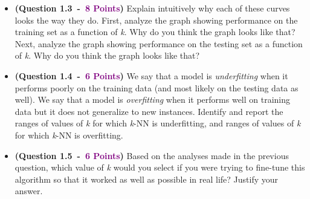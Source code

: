 \documentclass{article}
\newcommand{\POINTS}[1]{\textcolor{purple}{\textbf{{#1}}}}
\begin{document}
\begin{itemize}
        \item \textbf{(Question 1.3~-~\POINTS{8 Points})} Explain intuitively why each of these curves looks the way they do. First, analyze the graph showing performance on the training set as a function of \textit{k}. Why do you think the graph looks like that? Next, analyze the graph showing performance on the testing set as a function of \textit{k}. Why do you think the graph looks like that?




        \item \textbf{(Question 1.4~-~\POINTS{6 Points})} We say that a model is \textit{underfitting} when it performs poorly on the training data (and most likely on the testing data as well). We say that a model is \textit{overfitting} when it performs well on training data but it does not generalize to new instances. Identify and report the ranges of values of \textit{k} for which \textit{k}-NN is underfitting, and ranges of values of \textit{k} for which \textit{k}-NN is overfitting.




        \item \textbf{(Question 1.5~-~\POINTS{6 Points})} Based on the analyses made in the previous question, which value of \textit{k} would you select if you were trying to fine-tune this algorithm so that it worked as well as possible in real life? Justify your answer.





\end{itemize}
\end{document}
